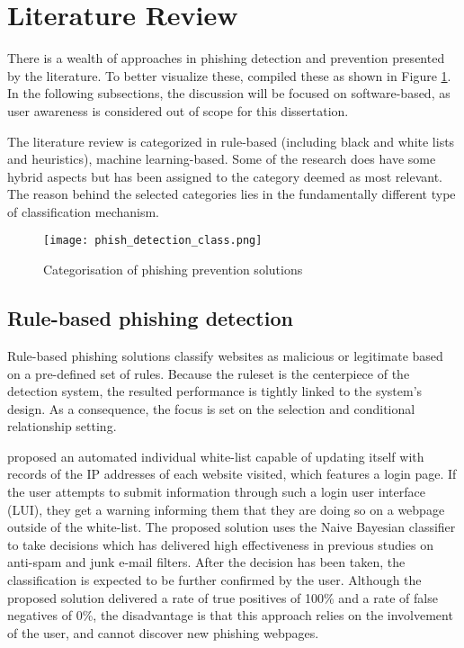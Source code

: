 
\section{Literature Review}
There is a wealth of approaches in phishing detection and prevention presented by the literature. To better visualize these, \cite{ML_BASED_DETECTION_FROM_URL} compiled these as shown in Figure \ref{fig:PHISHING_SOLUTION_CATEGS}. In the following subsections, the discussion will be focused on software-based, as user awareness is considered out of scope for this dissertation.

The literature review is categorized in rule-based (including black and white lists and heuristics), machine learning-based. Some of the research does have some hybrid aspects but has been assigned to the category deemed as most relevant. The reason behind the selected categories lies in the fundamentally different type of classification mechanism.

\begin{figure}[b]
	\centering
	\texttt{[image: phish\_detection\_class.png]}
	\caption{Categorisation of phishing prevention solutions \citep{ML_BASED_DETECTION_FROM_URL}}
	\label{fig:PHISHING_SOLUTION_CATEGS}
\end{figure}

\subsection{Rule-based phishing detection}
\label{RULEBASED}

Rule-based phishing solutions classify websites as malicious or legitimate based on a pre-defined set of rules. Because the ruleset is the centerpiece of the detection system, the resulted performance is tightly linked to the system's design. As a consequence, the focus is set on the selection and conditional relationship setting.

\cite{ANTIPHISHING_AUTOMATED_WHITELIST} proposed an automated individual white-list capable of updating itself with records of the IP addresses of each website visited, which features a login page. If the user attempts to submit information through such a login user interface (LUI), they get a warning informing them that they are doing so on a webpage outside of the white-list. The proposed solution uses the Naive Bayesian classifier to take decisions which has delivered high effectiveness in previous studies on anti-spam \citep{BAESYAN_KEYWORD_COMPARISON} and junk e-mail \citep{BAESYAN_JUNK_FILTERING} filters. After the decision has been taken, the classification is expected to be further confirmed by the user. Although the proposed solution delivered a rate of true positives of 100\% and a rate of false negatives of 0\%, the disadvantage is that this approach relies on the involvement of the user, and cannot discover new phishing webpages.

